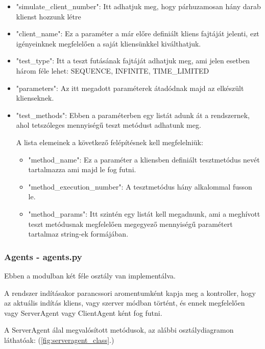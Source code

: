 \documentclass[a4paper,12pt,oneside]{report}
\begin{document}
\begin{itemize}
	\itemsep0em
		\item "simulate\_client\_number": Itt adhatjuk meg, hogy párhuzamosan hány darab klienst hozzunk létre
		\item "client\_name": Ez a paraméter a már előre definiált kliens fajtáját jelenti, ezt igényeinknek megfelelően a saját kliensünkkel kiválthatjuk.
		\item "test\_type": Itt a teszt futásának fajtáját adhatjuk meg, ami jelen esetben három féle lehet: SEQUENCE, INFINITE, TIME\_LIMITED
		\item "parameters": Az itt megadott paraméterek átadódnak majd az elkészült klienseknek.
		\item "test\_methods": Ebben a paraméterben egy listát adunk át a rendszernek, ahol tetszóleges mennyiségű teszt metódust adhatunk meg.

		A lista elemeinek a következő felépítésnek kell megfelelniük:
		\begin{itemize}
			\itemsep0em
				\item "method\_name": Ez a paraméter a kliensben definiált tesztmetódus nevét tartalmazza ami majd le fog futni.
				\item "method\_execution\_number": A tesztmetódus hány alkalommal fusson le.
				\item "method\_params": Itt szintén egy listát kell megadnunk, ami a meghívott teszt metódusnak megfelelően megegyező mennyiségű paramétert tartalmaz string-ek formájában.
		\end{itemize}

\end{itemize}
\newpage
\subsubsection{Agents - agents.py}

Ebben a modulban két féle osztály van implementálva.

A rendszer indításakor parancssori aromentumként kapja meg a kontroller, hogy az aktuális indítás kliens, vagy szerver módban történt, és ennek megfelelően vagy ServerAgent vagy ClientAgent ként fog futni.

A ServerAgent álal megvalósított metódusok, az alábbi osztálydiagramon láthatóak: (\ref{fig:serveragent_class}.)
\end{document}
